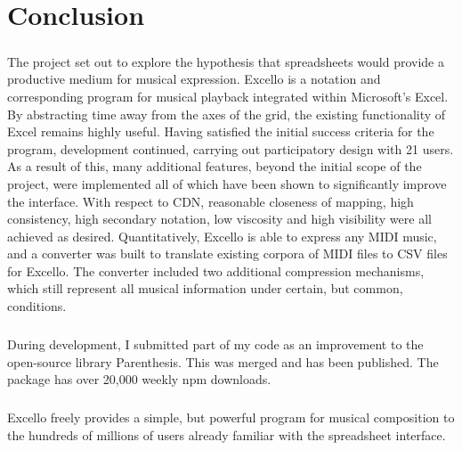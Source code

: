 
\chapter{Conclusion}

\paragraph{} The project set out to explore the hypothesis that spreadsheets would provide a productive medium for musical expression. Excello is a notation and corresponding program for musical playback integrated within Microsoft's Excel. By abstracting time away from the axes of the grid, the existing functionality of Excel remains highly useful. Having satisfied the initial success criteria for the program, development continued, carrying out participatory design with 21 users. As a result of this, many additional features, beyond the initial scope of the project, were implemented all of which have been shown to significantly improve the interface. With respect to CDN, reasonable closeness of mapping, high consistency, high secondary notation, low viscosity and high visibility were all achieved as desired. Quantitatively, Excello is able to express any  MIDI music, and a converter was built to translate existing corpora of MIDI files to CSV files for Excello. The converter included two additional compression mechanisms, which still represent all musical information under certain, but common, conditions.

\paragraph{} During development, I submitted part of my code as an improvement to the open-source library Parenthesis. This was merged and has been published. The package has over 20,000 weekly npm downloads.

\paragraph{} Excello freely provides a simple, but powerful program for musical composition to the hundreds of millions of users already familiar with the spreadsheet interface.
